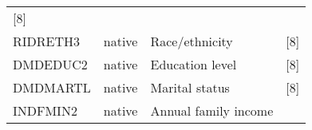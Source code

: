 \documentclass[]{article}
\begin{document}
\begin{longtable}[]{@{}llll@{}}
\begin{minipage}[t]{0.31\columnwidth}
{[}8{]}\strut
\end{minipage}\tabularnewline
\begin{minipage}[t]{0.10\columnwidth}\raggedright
RIDRETH3\strut
\end{minipage} & \begin{minipage}[t]{0.05\columnwidth}\raggedright
native\strut
\end{minipage} & \begin{minipage}[t]{0.43\columnwidth}\raggedright
Race/ethnicity\strut
\end{minipage} & \begin{minipage}[t]{0.31\columnwidth}\raggedright
{[}8{]}\strut
\end{minipage}\tabularnewline
\begin{minipage}[t]{0.10\columnwidth}\raggedright
DMDEDUC2\strut
\end{minipage} & \begin{minipage}[t]{0.05\columnwidth}\raggedright
native\strut
\end{minipage} & \begin{minipage}[t]{0.43\columnwidth}\raggedright
Education level\strut
\end{minipage} & \begin{minipage}[t]{0.31\columnwidth}\raggedright
{[}8{]}\strut
\end{minipage}\tabularnewline
\begin{minipage}[t]{0.10\columnwidth}\raggedright
DMDMARTL\strut
\end{minipage} & \begin{minipage}[t]{0.05\columnwidth}\raggedright
native\strut
\end{minipage} & \begin{minipage}[t]{0.43\columnwidth}\raggedright
Marital status\strut
\end{minipage} & \begin{minipage}[t]{0.31\columnwidth}\raggedright
{[}8{]}\strut
\end{minipage}\tabularnewline
\begin{minipage}[t]{0.10\columnwidth}\raggedright
INDFMIN2\strut
\end{minipage} & \begin{minipage}[t]{0.05\columnwidth}\raggedright
native\strut
\end{minipage} & \begin{minipage}[t]{0.43\columnwidth}\raggedright
Annual family income\strut
\end{minipage} & \begin{minipage}[t]{0.31\columnwidth}\raggedright

\end{minipage}
\end{longtable}
\end{document}
